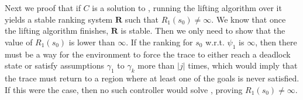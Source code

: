 Next we proof that if $C$ is a solution to \controlProblem, running the lifting algorithm over it yields a stable ranking system $\mathbf{R}$ such that $R_1(s_0) \neq \infty$. 
We know that once the lifting algorithm finishes, $\mathbf{R}$ is stable. Then we only need to show that the value of $R_1(s_0)$ is lower than $\infty$. If the ranking for $s_0$ w.r.t. $\psi_1$ is $\infty$, then there must be a way for the environment to force the trace to either reach a deadlock state or satisfy assumptions $\gamma_1$ to $\gamma_k$ more than $|j|$ times, which would imply that the trace must return to a region where at least one of the goals is never satisfied. If this were the case, then no such controller would solve \controlProblem, proving $R_1(s_0) \neq \infty$.